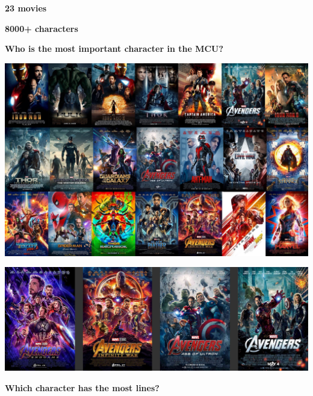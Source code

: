\documentclass{beamer}
\begin{document}
\begin{frame}
    \begin{minipage}{.49\textwidth}
        \centering
        \textbf{\Large{23 movies}}
    \end{minipage} \pause
    \begin{minipage}{.49\textwidth}
        \centering
        \textbf{\Large{8000+ characters}}
    \end{minipage}
\end{frame}

\begin{frame}
    \centering
    \textbf{\large{Who is the most important character in the MCU?}}
\end{frame}

\begin{frame}
    \centering
    \includegraphics[width=\textwidth]{static/MCU.jpg}
\end{frame}

\begin{frame}
    \centering
    \includegraphics[width=\textwidth]{static/avenger.jpg}
\end{frame}

\begin{frame}
    \centering
    \textbf{\large{Which character has the most lines?}}
\end{frame}
\end{document}
